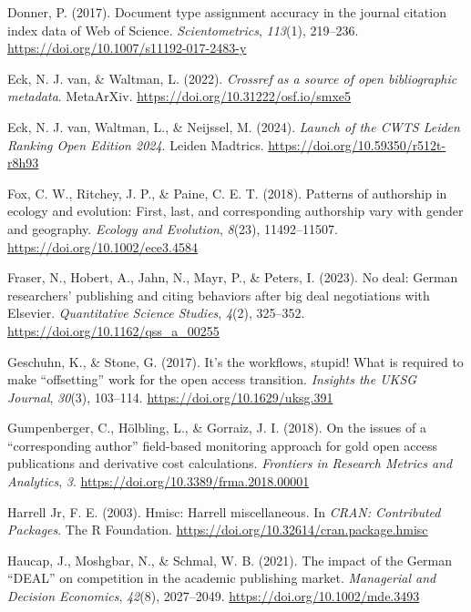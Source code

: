 \documentclass[a4paper,man,floatsintext,longtable,noextraspace,10pt]{apa6}
\newlength{\cslhangindent}
\newenvironment{CSLReferences}[2] %
{\begin{list}{}{%
  \setlength{\itemindent}{0pt}
  \setlength{\leftmargin}{0pt}
  \setlength{\parsep}{0pt}
  \ifodd #1
  \setlength{\leftmargin}{\cslhangindent}
  \setlength{\itemindent}{-1\cslhangindent}
  \fi
  \setlength{\itemsep}{#2\baselineskip}}}
{\end{list}}
\begin{document}
\begin{CSLReferences}{1}{0}
Donner, P. (2017). Document type assignment accuracy in the journal
citation index data of {Web of Science}. \emph{Scientometrics},
\emph{113}(1), 219--236. \url{https://doi.org/10.1007/s11192-017-2483-y}

Eck, N. J. van, \& Waltman, L. (2022). \emph{Crossref as a source of
open bibliographic metadata}. MetaArXiv.
\url{https://doi.org/10.31222/osf.io/smxe5}

Eck, N. J. van, Waltman, L., \& Neijssel, M. (2024). \emph{{Launch of
the CWTS Leiden Ranking Open Edition 2024}}. Leiden Madtrics.
\url{https://doi.org/10.59350/r512t-r8h93}

Fox, C. W., Ritchey, J. P., \& Paine, C. E. T. (2018). Patterns of
authorship in ecology and evolution: First, last, and corresponding
authorship vary with gender and geography. \emph{Ecology and Evolution},
\emph{8}(23), 11492--11507. \url{https://doi.org/10.1002/ece3.4584}

Fraser, N., Hobert, A., Jahn, N., Mayr, P., \& Peters, I. (2023). No
deal: German researchers' publishing and citing behaviors after big deal
negotiations with {Elsevier}. \emph{Quantitative Science Studies},
\emph{4}(2), 325--352. \url{https://doi.org/10.1162/qss_a_00255}

Geschuhn, K., \& Stone, G. (2017). It's the workflows, stupid! What is
required to make {``offsetting''} work for the open access transition.
\emph{Insights the {UKSG} Journal}, \emph{30}(3), 103--114.
\url{https://doi.org/10.1629/uksg.391}

Gumpenberger, C., Hölbling, L., \& Gorraiz, J. I. (2018). On the issues
of a {``corresponding author''} field-based monitoring approach for gold
open access publications and derivative cost calculations.
\emph{Frontiers in Research Metrics and Analytics}, \emph{3}.
\url{https://doi.org/10.3389/frma.2018.00001}

Harrell Jr, F. E. (2003). Hmisc: Harrell miscellaneous. In \emph{CRAN:
Contributed Packages}. The R Foundation.
\url{https://doi.org/10.32614/cran.package.hmisc}

Haucap, J., Moshgbar, N., \& Schmal, W. B. (2021). The impact of the
{German {``DEAL''}} on competition in the academic publishing market.
\emph{Managerial and Decision Economics}, \emph{42}(8), 2027--2049.
\url{https://doi.org/10.1002/mde.3493}


\end{CSLReferences}
\end{document}
